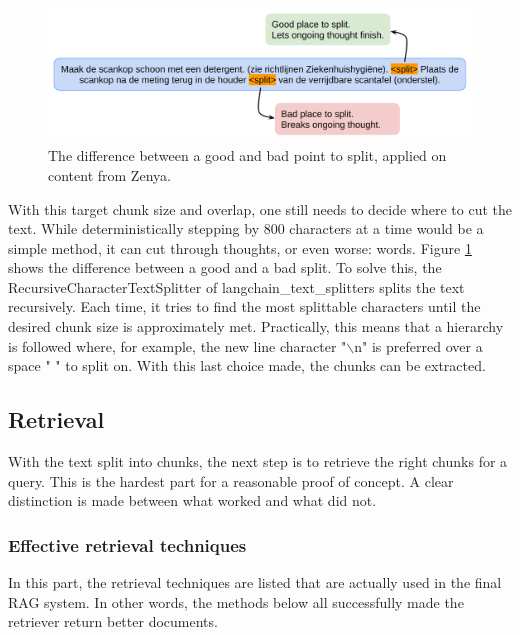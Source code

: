 \begin{figure}[h]
    \captionsetup{justification=centering}
    \centerline{\includegraphics[width=1\linewidth]{fig/good_split_bad_split.png}}
    \caption{The difference between a good and bad point to split, applied on content from Zenya.}
    \label{fig:good_split_bad_split}
\end{figure}

With this target chunk size and overlap, one still needs to decide where to cut the text. While deterministically stepping by 800 characters at a time would be a simple method, it can cut through thoughts, or even worse: words. Figure \ref{fig:good_split_bad_split} shows the difference between a good and a bad split. To solve this, the RecursiveCharacterTextSplitter of langchain\_text\_splitters splits the text recursively. Each time, it tries to find the most splittable characters until the desired chunk size is approximately met. Practically, this means that a hierarchy is followed where, for example, the new line character "$\backslash$n" is preferred over a space " " to split on. With this last choice made, the chunks can be extracted.

\subsection{Retrieval}
With the text split into chunks, the next step is to retrieve the right chunks for a query. This is the hardest part for a reasonable proof of concept. A clear distinction is made between what worked and what did not.

\subsubsection{Effective retrieval techniques}
In this part, the retrieval techniques are listed that are actually used in the final RAG system. In other words, the methods below all successfully made the retriever return better documents.

